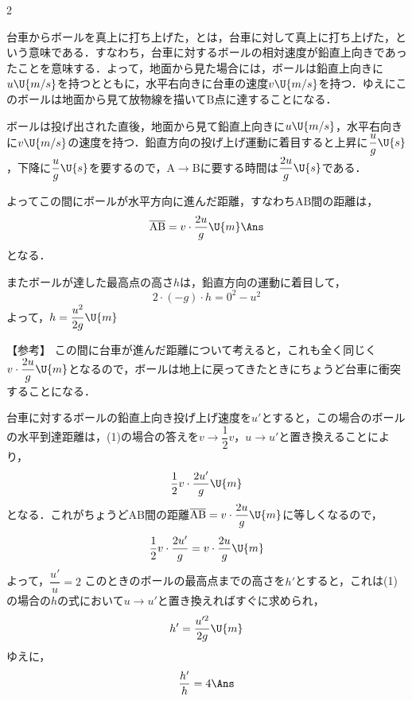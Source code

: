 \begin{multicols}{2}
\par\nopagebreak
\begin{sisin}
台車からボールを真上に打ち上げた，とは，台車に対して真上に打ち上げた，という意味である．すなわち，台車に対するボールの相対速度が鉛直上向きであったことを意味する．よって，地面から見た場合には，ボールは鉛直上向きに$u\U{m/s}$を持つとともに，水平右向きに台車の速度$v\U{m/s}$を持つ．ゆえにこのボールは地面から見て放物線を描いて$\mathrm{B}$点に達することになる．
\end{sisin}
\par\nopagebreak
\begin{komon}
 ボールは投げ出された直後，地面から見て鉛直上向きに$u\U{m/s}$，水平右向きに$v\U{m/s}$の速度を持つ．鉛直方向の投げ上げ運動に着目すると上昇に$\dfrac{u}{g}\U{s}$，下降に$\dfrac{u}{g}\U{s}$を要するので，$\mathrm{A}\to\mathrm{B}$に要する時間は$\dfrac{2u}{g}\U{s}$である．\par
       \hspace{1zw}よってこの間にボールが水平方向に進んだ距離，すなわち$\mathrm{AB}$間の距離は，
       \[\overline{\mathrm{AB}}=v\cdot\frac{2u}{g}\U{m}\Ans\]
       となる．\par
       \hspace{1zw}またボールが達した最高点の高さ$h$は，鉛直方向の運動に着目して，
       \[2\cdot(-g)\cdot h=0^2-u^2\]
       よって，$h=\dfrac{u^2}{2g}\U{m}$\Ans
\end{komon}
\begin{itembox}[l]{【参考】}
\hspace{1zw}この間に台車が進んだ距離について考えると，これも全く同じく$v\cdot\dfrac{2u}{g}\U{m}$となるので，ボールは地上に戻ってきたときにちょうど台車に衝突することになる．
\end{itembox}
\begin{komon}
 台車に対するボールの鉛直上向き投げ上げ速度を$u'$とすると，この場合のボールの水平到達距離は，(1)の場合の答えを$v\to\dfrac{1}{2}v$，$u\to u'$と置き換えることにより，
       \[\frac{1}{2}v\cdot\frac{2u'}{g}\U{m}\]
       となる．これがちょうど$\mathrm{AB}$間の距離$\overline{\mathrm{AB}}=v\cdot\dfrac{2u}{g}\U{m}$に等しくなるので，
       \[\frac{1}{2}v\cdot\frac{2u'}{g}=v\cdot\frac{2u}{g}\U{m}\]
       よって，$\dfrac{u'}{u}=2$\Ans
{} このときのボールの最高点までの高さを$h'$とすると，これは(1)の場合の$h$の式において$u\to u'$と置き換えればすぐに求められ，
       \[h'=\frac{u'^2}{2g}\U{m}\]
       ゆえに，
       \[\frac{h'}{h}=4\Ans\]
\end{komon}


\end{multicols}
